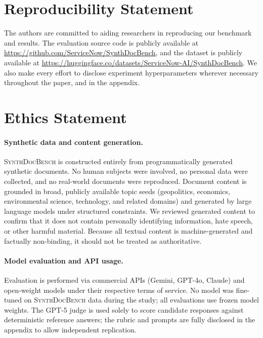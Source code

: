 \documentclass{article} %
\begin{document}



\section*{Reproducibility Statement}
The authors are committed to aiding researchers in reproducing our benchmark and results. The evaluation source code is publicly available at \url{https://github.com/ServiceNow/SynthDocBench}, and the dataset is publicly available at \url{https://huggingface.co/datasets/ServiceNow-AI/SynthDocBench}. We also make every effort to disclose experiment hyperparameters wherever necessary throughout the paper, and in the appendix.

\section*{Ethics Statement}
 
\paragraph{Synthetic data and content generation.}
\textsc{SynthDocBench} is constructed entirely from programmatically generated synthetic
documents. No human subjects were involved, no personal data were collected, and no
real-world documents were reproduced. Document content is grounded in broad, publicly
available topic seeds (geopolitics, economics, environmental science, technology, and
related domains) and generated by large language models under structured constraints.
We reviewed generated content to confirm that it does not contain personally identifying
information, hate speech, or other harmful material. Because all textual content is
machine-generated and factually non-binding, it should not be treated as authoritative.

\paragraph{Model evaluation and API usage.}
Evaluation is performed via commercial APIs (Gemini, GPT-4o, Claude) and
open-weight models under their respective terms of service. No model was fine-tuned on
\textsc{SynthDocBench} data during the study; all evaluations use frozen model weights.
The GPT-5 judge is used solely to score candidate responses against deterministic
reference answers; the rubric and prompts are fully disclosed in the appendix to
allow independent replication.
\end{document}
